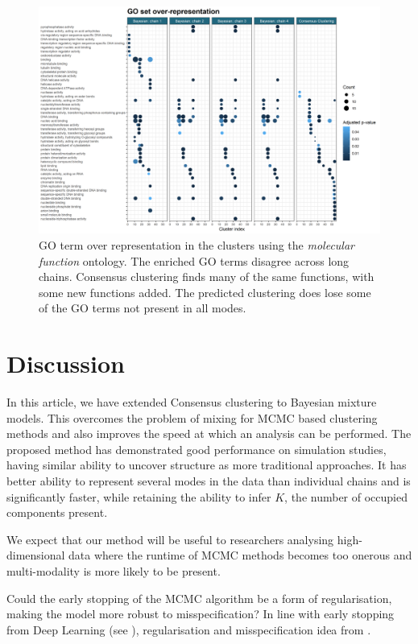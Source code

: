 \documentclass{bioinfo}
\begin{document}
\begin{figure} %
	\centering
	\includegraphics[scale=0.3]{./Images/Yeast/GOoverRepresentation.png}
	\caption{GO term over representation in the clusters using the \emph{molecular function} ontology. The enriched GO terms disagree across long chains. Consensus clustering finds many of the same functions, with some new functions added. The predicted clustering does lose some of the GO terms not present in all modes.}
	\label{fig:yeastGOchains}
\end{figure}

\section{Discussion}

In this article, we have extended Consensus clustering to Bayesian mixture models. This overcomes the problem of mixing for MCMC based clustering methods and also improves the speed at which an analysis can be performed. The proposed method has demonstrated good performance on simulation studies, having similar ability to uncover structure as more traditional approaches. It has better ability to represent several modes in the data than individual chains and is significantly faster, while retaining the ability to infer $K$, the number of occupied components present. 

We expect that our method will be useful to researchers analysing high-dimensional data where the runtime of MCMC methods becomes too onerous and multi-modality is more likely to be present.

Could the early stopping of the MCMC algorithm be a form of regularisation, making the model more robust to misspecification? In line with early stopping from Deep Learning (see \citealp{morgan1990generalization}), regularisation and misspecification idea from \cite{miller2018robust, cai2020finite}.
\end{document}

